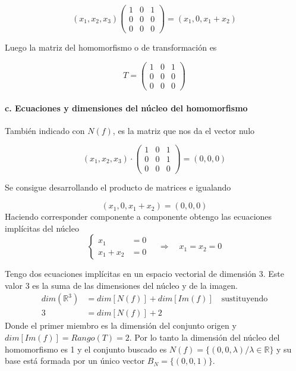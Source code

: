 \begin{problema}{\cite[10p346]{palacios}}
	$$(x_1,x_2,x_3)
	\begin{pmatrix}
		1 & 0 & 1 \\
		0 & 0 & 0 \\
		0 & 0 & 0
	\end{pmatrix}
	=(x_1, 0, x_1+x_2)$$
	
	Luego la matriz del homomorfismo o de transformación es

	$$T=\begin{pmatrix}
		1 & 0 & 1 \\
		0 & 0 & 0 \\
		0 & 0 & 0
	\end{pmatrix}$$

	\paragraph{c. Ecuaciones y dimensiones del núcleo del homomorfismo} También indicado con $N(f)$,
	es la matriz que nos da el vector nulo

	$$(x_1,x_2,x_3)\cdot
	\begin{pmatrix}
		1 & 0 & 1 \\
		0 & 0 & 1 \\
		0 & 0 & 0
	\end{pmatrix}
	=(0,0,0)
	$$

	Se consigue desarrollando el producto de matrices e igualando

	$$(x_1,0,x_1+x_2)=(0,0,0)$$
	Haciendo corresponder componente a componente obtengo las ecuaciones implícitas del núcleo
	$$
	\begin{cases}
		x_1 &=0 \\
		x_1+x_2 &= 0
	\end{cases}
	\quad\Rightarrow\quad
	x_1=x_2=0
	$$
	
	Tengo dos ecuaciones implícitas en un espacio vectorial de dimensión 3. Este valor 3 es la suma
	de las dimensiones del núcleo y de la imagen.\\
	\begin{align*}
		dim(\mathbb{R}^3) &= dim[N(f)]+dim[Im(f)] \quad \scriptstyle{\text{sustituyendo}}\\
		3 &= dim[N(f)] + 2
	\end{align*}
	Donde el primer miembro es la dimensión del conjunto origen y $dim[Im(f)]=Rango(T)=2$. Por lo tanto la dimensión 
	del núcleo del homomorfismo es 1 y el conjunto buscado es
	$N(f)=\{(0,0,\lambda) / \lambda \in \mathbb{R}\}$ y su base está formada por un único vector
	$B_N=\{(0,0,1)\}$.


\end{problema}
